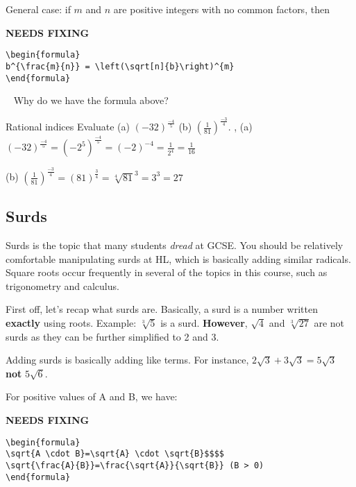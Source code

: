 \documentclass[../../main.tex]{subfiles}
\begin{document}
General case: if $m$ and $n$ are positive integers with no common factors, then

{\hfill\Large\bfseries NEEDS FIXING\hfill}
\begin{lstlisting}
\begin{formula}
b^{\frac{m}{n}} = \left(\sqrt[n]{b}\right)^{m}
\end{formula}
 \end{lstlisting}
\begin{thinking}{~}
Why do we have the formula above?
\end{thinking}

\begin{example}{Rational indices}
Evaluate (a) $(-32)^{\frac{-4}{5}}$ \hspace{1cm} (b) $\left(\frac{1}{81}\right)^{\frac{-3}{4}}$.
\sep
(a) $(-32)^{\frac{-4}{5}}=\left(-2^{5}\right)^{\frac{-4}{5}}=(-2)^{-4}=\frac{1}{2^{4}}=\frac{1}{16}$

(b) $\left(\frac{1}{81}\right)^{\frac{-3}{4}}=(81)^{\frac{3}{4}}=\sqrt[4]{81}^{3}=3^{3}=27$
\end{example}

\subsection{Surds}
Surds is the topic that many students \textit{dread} at GCSE.
You should be relatively comfortable manipulating surds at HL, which is basically adding similar radicals. Square roots occur frequently in several of the topics in this course, such as trigonometry and calculus.

First off, let's recap what surds are. Basically, a surd is a number written \textbf{exactly} using roots. Example: $\sqrt[3]{5}$ is a surd.
\textbf{However}, $\sqrt{4}$ and $\sqrt[3]{27}$ are not surds as they can be further simplified to 2 and 3.

Adding surds is basically adding like terms. For instance, $2\sqrt{3}+3\sqrt{3}=5\sqrt{3}$ \textbf{not} $5\sqrt{6}$. %

For positive values of A and B, we have:

{\hfill\Large\bfseries NEEDS FIXING\hfill}
\begin{lstlisting}
\begin{formula}
\sqrt{A \cdot B}=\sqrt{A} \cdot \sqrt{B}$$$$
\sqrt{\frac{A}{B}}=\frac{\sqrt{A}}{\sqrt{B}} (B > 0)
\end{formula}
 \end{lstlisting}
\end{document}
